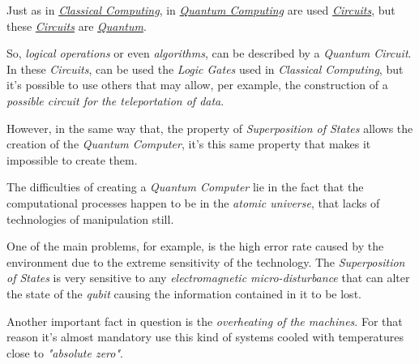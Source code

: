 \documentclass[conference]{IEEEtran}
\begin{document}
\newpage

Just as in \href{https://en.wikipedia.org/wiki/Von_Neumann_architecture}{\textit{Classical Computing}}, in \href{https://en.wikipedia.org/wiki/Quantum_computing}{\textit{Quantum Computing}} are used \href{https://en.wikipedia.org/wiki/Circuit}{\textit{Circuits}}, but these \href{https://en.wikipedia.org/wiki/Circuit}{\textit{Circuits}} are \href{https://en.wikipedia.org/wiki/Quantum}{\textit{Quantum}}.

\vspace{4pt}

So, \textit{logical operations} or even \textit{algorithms}, can be described by a \textit{Quantum Circuit}. In these \textit{Circuits}, can be used the \textit{Logic Gates} used in \textit{Classical Computing}, but it's possible to use others that may allow, per example, the construction of a \textit{possible circuit for the teleportation of data}.

\vspace{4pt}

However, in the same way that, the property of \textit{Superposition of States} allows the creation of the \textit{Quantum Computer}, it's this same property that makes it impossible to create them.

\vspace{4pt}

The difficulties of creating a \textit{Quantum Computer} lie in the fact that the computational processes happen to be in the \textit{atomic universe}, that lacks of technologies of manipulation still.

\vspace{4pt}

One of the main problems, for example, is the high error rate caused by the environment due to the extreme sensitivity of the technology. The \textit{Superposition of States} is very sensitive to any \textit{electromagnetic micro-disturbance} that can alter the state of the \textit{qubit} causing the information contained in it to be lost.

\vspace{4pt}

Another important fact in question is the \textit{overheating of the machines}. For that reason it's almost mandatory use this kind of systems cooled with temperatures close to \textit{"absolute zero"}.

\vspace{4pt}
\end{document}
